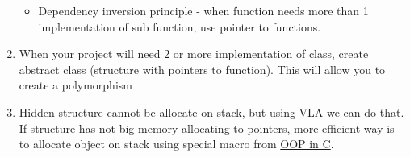 \begin{enumerate}
\begin{itemize}
            \item Dependency inversion principle - when function needs more than 1 implementation of sub function, use pointer to functions.
        \end{itemize}
    \item When your project will need 2 or more implementation of class, create abstract class (structure with pointers to function). This will allow you to create a polymorphism
    \item Hidden structure cannot be allocate on stack, but using VLA we can do that. If structure has not big memory allocating to pointers, more efficient way is to allocate object on stack using special macro from \href{https://github.com/Kukos/OOP-in-C}{OOP in C}.
\end{enumerate}


